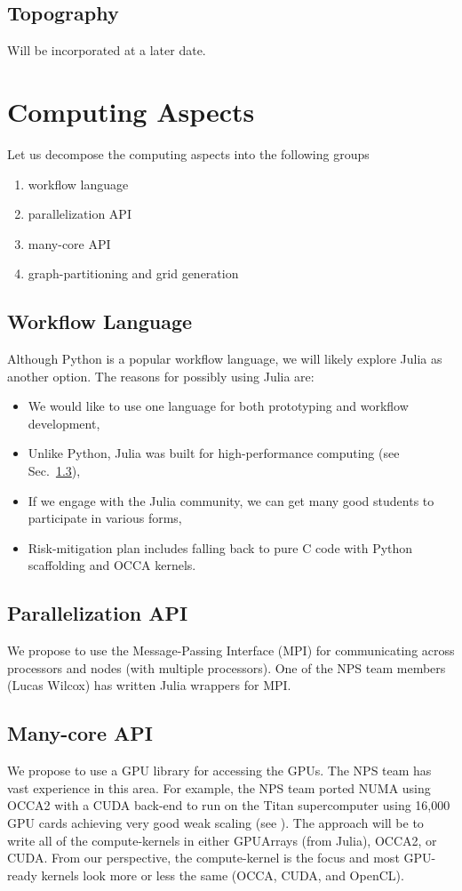 \documentclass[12pt]{article}
\begin{document}
\subsection{Topography}
Will be incorporated at a later date.

\section{Computing Aspects}
\label{sec:computing_aspects}

Let us decompose the computing aspects into the following groups
\begin{enumerate}
\item workflow language
\item parallelization API
\item many-core API
\item graph-partitioning and grid generation

\end{enumerate}

\subsection{Workflow Language}
Although Python is a popular workflow language, we will likely explore Julia as another option.  The reasons for possibly using Julia are: 
\begin{itemize}
\item We would like to use one language for both prototyping and workflow development,
\item Unlike Python, Julia was built for high-performance computing (see Sec.\ \ref{sec:computing_aspects/manycore}),
\item If we engage with the Julia community, we can get many good students to participate in various forms,
\item Risk-mitigation plan includes falling back to pure C code with Python scaffolding and OCCA kernels.
\end{itemize} 

\subsection{Parallelization API}
We propose to use the Message-Passing Interface (MPI) for communicating across processors and nodes (with multiple processors).  One of the NPS team members (Lucas Wilcox) has written Julia wrappers for MPI.

\subsection{Many-core API}
\label{sec:computing_aspects/manycore}
We propose to use a GPU library for accessing the GPUs. The NPS team has vast experience in this area. For example, the NPS team ported NUMA using OCCA2 with a CUDA back-end to run on the Titan supercomputer using 16,000 GPU cards achieving very good weak scaling (see \cite{abdi:2016b,abdi:2018}). The approach will be to write all of the compute-kernels in either GPUArrays (from Julia), OCCA2, or CUDA. From our perspective, the compute-kernel is the focus and most GPU-ready kernels look more or less the same (OCCA, CUDA, and OpenCL). 
\end{document}
